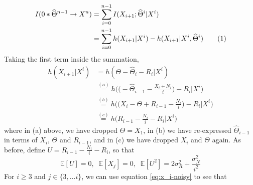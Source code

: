 \documentclass[conference]{IEEEtran}
\newcommand\numberthis{\stepcounter{equation}\tag{\theequation}}
\begin{document}
\begin{align*}
	I(0*\widehat\Theta^{n-1} \rightarrow X^n) &= \sum_{i=0}^{n-1}{I(X_{i+1}; \widehat\Theta^i | X^i)} \\
											  &= \sum_{i=0}^{n-1}{h(X_{i+1} | X^i) - h(X_{i+1} | X^i, \widehat\Theta^i)} \numberthis \label{eq:dir-info-rev-noisy}
\end{align*}
Taking the first term inside the summation,
\begin{align*}
	h(X_{i+1} | X^i) &= h(\Theta - \widehat\Theta_i - R_i | X^i) \\
					&\overset{(a)}{=} h \bigg( \bigg( - \widehat\Theta_{i-1} - \frac{X_i + N_i}{i} \bigg) - R_i \bigg| X^i \bigg) \\
					&\overset{(b)}{=} h \bigg( \bigg( X_i - \Theta + R_{i-1} - \frac{N_i}{i} \bigg) - R_i \bigg| X^i \bigg) \\
					&\overset{(c)}{=} h \bigg( R_{i-1} - \frac{N_i}{i} - R_i \bigg| X^i \bigg)
\end{align*}
where in (a) above, we have dropped $\Theta = X_1$, in (b) we have re-expressed $\widehat\Theta_{i-1}$ in terms of $X_i$, $\Theta$ and $R_{i-1}$, and in (c) we have dropped $X_i$ and $\Theta$ again. As before, define $U = R_{i-1} - \frac{N_i}{i} - R_i$, so that
\begin{equation*}
	\mathbb{E}[U] = 0,\; \; \mathbb{E}[X_j] = 0, \; \; \mathbb{E}[U^2] = 2 \sigma_R^2 + \frac{\sigma_N^2}{i^2}
\end{equation*}
For $i \geq 3$ and $j \in \{3, \ldots i\}$, we can use equation \eqref{eq:x_i-noisy} to see that
\end{document}
